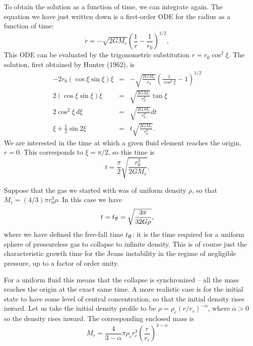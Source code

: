 To obtain the solution as a function of time, we can integrate again. The equation we have just written down is a first-order ODE for the radius as a function of time:
\begin{equation}
\dot{r} =  -\sqrt{2GM_r}\left(\frac{1}{r}-\frac{1}{r_0}\right)^{1/2},
\end{equation}
This ODE can be evaluated by the trigonometric substitution $r=r_0 \cos^2\xi$. The solution, first obtained by Hunter (1962), is
\begin{eqnarray}
-2 r_0 (\cos\xi \sin\xi) \dot{\xi} & = & -\sqrt{\frac{2GM_r}{r_0}} \left(\frac{1}{\cos^2\xi}-1\right)^{1/2} \\
2 (\cos\xi\sin\xi) \dot{\xi} & = & \sqrt{\frac{2GM_r}{r_0^3}}\tan\xi \\
2 \cos^2\xi\, d\xi & = & \sqrt{\frac{2GM_r}{r_0^3}} dt \\
\xi+\frac{1}{2}\sin 2\xi & = & t \sqrt{\frac{2GM_r}{r_0^3}}.
\end{eqnarray}
We are interested in the time at which a given fluid element reaches the origin, $r=0$. This corresponds to $\xi = \pi/2$, so this time is
\begin{equation}
t = \frac{\pi}{2}\sqrt{\frac{r_0^3}{2 G M_r}}.
\end{equation}

Suppose that the gas we started with was of uniform density $\rho$, so that $M_r = (4/3)\pi r_0^3 \rho$.
In this case we have
\begin{equation}
t = t_{\rm ff} = \sqrt{\frac{3\pi}{32 G \rho}},
\end{equation}
where we have defined the free-fall time $t_{\rm ff}$: it is the time required for a uniform sphere of pressureless gas to collapse to infinite density. This is of course just the characteristic growth time for the Jeans instability in the regime of negligible pressure, up to a factor of order unity.

For a uniform fluid this means that the collapse is synchronized -- all the mass reaches the origin at the exact same time. A more realistic case is for the initial state to have some level of central concentration, so that the initial density rises inward. Let us take the initial density profile to be $\rho = \rho_c (r/r_c)^{-\alpha}$, where $\alpha > 0$ so the density rises inward. The corresponding enclosed mass is
\begin{equation}
M_r = \frac{4}{3-\alpha}\pi \rho_c r_c^3 \left(\frac{r}{r_c}\right)^{3-\alpha} 
\end{equation}


